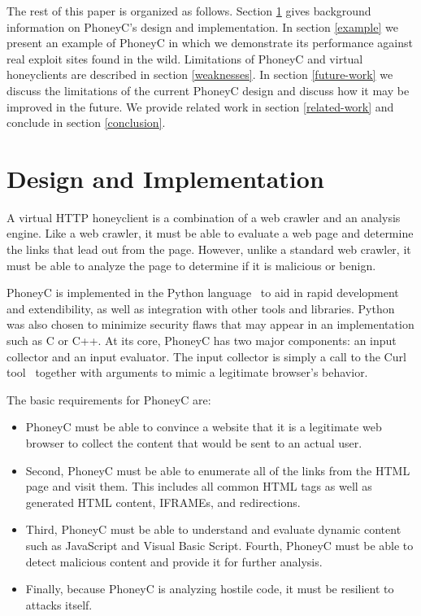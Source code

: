 \documentclass[10pt,twocolumn]{article}
\begin{document}
The rest of this paper is organized as follows. Section \ref{design} gives background information on PhoneyC's design and implementation. In section \ref{example} we present an example of PhoneyC in which we demonstrate its performance against real exploit sites found in the wild. Limitations of PhoneyC and virtual honeyclients are described in section \ref{weaknesses}. In section \ref{future-work} we discuss the limitations of the current PhoneyC design and discuss how it may be improved in the future. We provide related work in section \ref{related-work} and conclude in section \ref{conclusion}.

\section{Design and Implementation}
\label{design}

A virtual HTTP honeyclient is a combination of a web crawler and an analysis engine. Like a web crawler, it must be able to evaluate a web page and determine the links that lead out from the page. However, unlike a standard web crawler, it must be able to analyze the page to determine if it is malicious or benign. 

PhoneyC is implemented in the Python language~\cite{vanrossum2001plw} to aid in rapid development and extendibility, as well as integration with other tools and libraries. Python was also chosen to minimize security flaws that may appear in an implementation such as C or C++. At its core, PhoneyC has two major components: an input collector and an input evaluator. The input collector is simply a call to the Curl tool~\cite{ward2003clw} together with arguments to mimic a legitimate browser's behavior.

The basic requirements for PhoneyC are:
\begin{itemize}
	\item{PhoneyC must be able to convince a website that it is a legitimate web browser to collect the content that would be sent to an actual user.}
	\item{Second, PhoneyC must be able to enumerate all of the links from the HTML page and visit them. This includes all common HTML tags as well as generated HTML content, IFRAMEs, and redirections.} 
	\item{Third, PhoneyC must be able to understand and evaluate dynamic content such as JavaScript and Visual Basic Script. Fourth, PhoneyC must be able to detect malicious content and provide it for further analysis.} 
	\item{Finally, because PhoneyC is analyzing hostile code, it must be resilient to attacks itself.}
\end{itemize}
\end{document}
